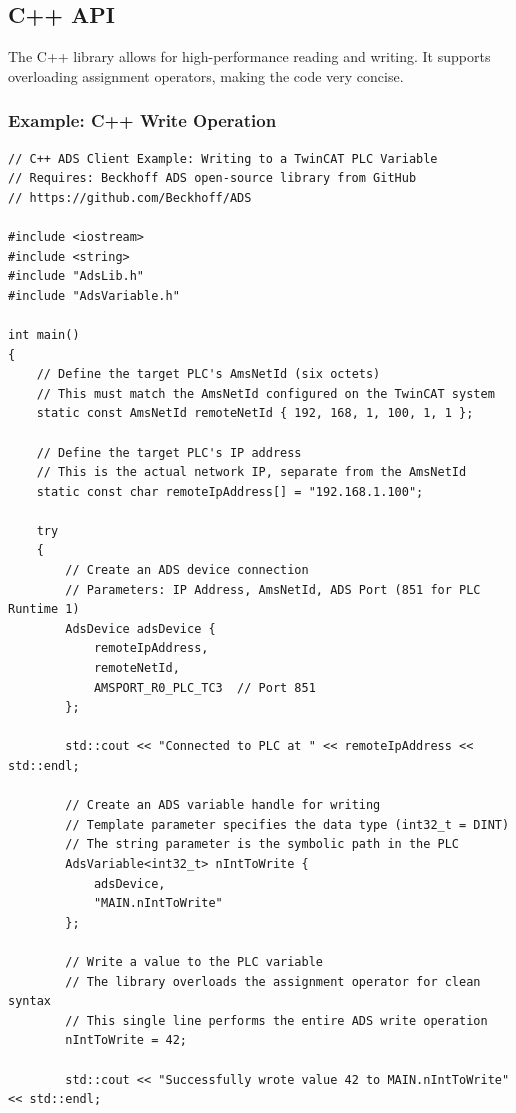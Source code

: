 \documentclass[11pt,a4paper]{article}
\begin{document}
\subsection{C++ API}

The C++ library allows for high-performance reading and writing. It supports overloading assignment operators, making the code very concise.

\subsubsection*{Example: C++ Write Operation}

\begin{lstlisting}[style=cppstyle]
// C++ ADS Client Example: Writing to a TwinCAT PLC Variable
// Requires: Beckhoff ADS open-source library from GitHub
// https://github.com/Beckhoff/ADS

#include <iostream>
#include <string>
#include "AdsLib.h"
#include "AdsVariable.h"

int main()
{
    // Define the target PLC's AmsNetId (six octets)
    // This must match the AmsNetId configured on the TwinCAT system
    static const AmsNetId remoteNetId { 192, 168, 1, 100, 1, 1 };
    
    // Define the target PLC's IP address
    // This is the actual network IP, separate from the AmsNetId
    static const char remoteIpAddress[] = "192.168.1.100";
    
    try
    {
        // Create an ADS device connection
        // Parameters: IP Address, AmsNetId, ADS Port (851 for PLC Runtime 1)
        AdsDevice adsDevice {
            remoteIpAddress,
            remoteNetId,
            AMSPORT_R0_PLC_TC3  // Port 851
        };
        
        std::cout << "Connected to PLC at " << remoteIpAddress << std::endl;
        
        // Create an ADS variable handle for writing
        // Template parameter specifies the data type (int32_t = DINT)
        // The string parameter is the symbolic path in the PLC
        AdsVariable<int32_t> nIntToWrite {
            adsDevice,
            "MAIN.nIntToWrite"
        };
        
        // Write a value to the PLC variable
        // The library overloads the assignment operator for clean syntax
        // This single line performs the entire ADS write operation
        nIntToWrite = 42;
        
        std::cout << "Successfully wrote value 42 to MAIN.nIntToWrite" << std::endl;
        

\end{lstlisting}
\end{document}
